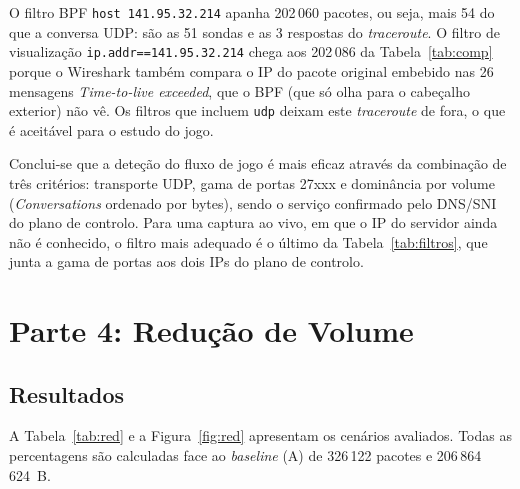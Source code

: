 \documentclass[10.5pt,a4paper]{article}
\begin{document}
O filtro BPF \texttt{host 141.95.32.214} apanha 202\,060 pacotes, ou seja, mais 54 do que a
conversa UDP: são as 51 sondas e as 3 respostas do \emph{traceroute}. O filtro de visualização
\texttt{ip.addr==141.95.32.214} chega aos 202\,086 da Tabela~\ref{tab:comp} porque o Wireshark
também compara o IP do pacote original embebido nas 26 mensagens \emph{Time-to-live exceeded},
que o BPF (que só olha para o cabeçalho exterior) não vê. Os filtros que incluem \texttt{udp}
deixam este \emph{traceroute} de fora, o que é aceitável para o estudo do jogo.

Conclui-se que a deteção do fluxo de jogo é mais eficaz através da combinação de três critérios:
transporte UDP, gama de portas 27xxx e dominância por volume (\emph{Conversations} ordenado por
bytes), sendo o serviço confirmado pelo DNS/SNI do plano de controlo. Para uma captura ao vivo,
em que o IP do servidor ainda não é conhecido, o filtro mais adequado é o último da
Tabela~\ref{tab:filtros}, que junta a gama de portas aos dois IPs do plano de controlo.

\section{Parte 4: Redução de Volume}

\subsection{Resultados}
A Tabela~\ref{tab:red} e a Figura~\ref{fig:red} apresentam os cenários avaliados. Todas as
percentagens são calculadas face ao \emph{baseline} (A) de 326\,122 pacotes e 206\,864\,624~B.
\end{document}
